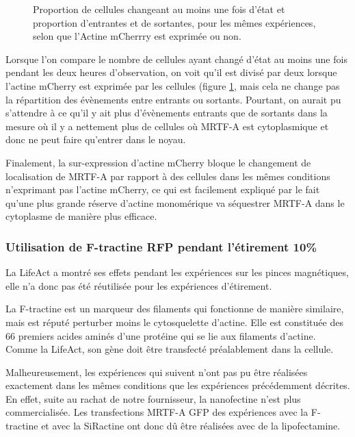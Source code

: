 \begin{figure}
\caption{\label{AMC}Répartition initiale pour des cellules issues des mêmes expériences exprimant ou non le plasmide Actine mCherry (683 cellules témoin et 538 cellules expriment l'Actine mCherry). **** : $p<10^{-4}$}\caption{\label{AMC_transloc}Proportion de cellules changeant au moins une fois d'état et proportion d'entrantes et de sortantes, pour les mêmes expériences, selon que l'Actine mCherrry est exprimée ou non.}
\end{figure}

Lorsque l'on compare le nombre de cellules ayant changé d'état au moins une fois pendant les deux heures d'observation, on voit qu'il est divisé par deux lorsque l'actine mCherry est exprimée par les cellules (figure \ref{AMC_transloc}, mais cela ne change pas la répartition des évènements entre entrants ou sortants. 
Pourtant, on aurait pu s'attendre à ce qu'il y ait plus d'évènements entrants que de sortants dans la mesure où il y a nettement plus de cellules où MRTF-A est cytoplasmique et donc ne peut faire qu'entrer dans le noyau. 

Finalement, la sur-expression d'actine mCherry bloque le changement de localisation de MRTF-A par rapport à des cellules dans les mêmes conditions n'exprimant pas l’actine mCherry, ce qui est facilement expliqué par le fait qu'une plus grande réserve d'actine monomérique va séquestrer MRTF-A dans le cytoplasme de manière plus efficace.

\subsubsection{Utilisation de F-tractine RFP pendant l'étirement 10\%}


La LifeAct a montré ses effets pendant les expériences sur les pinces magnétiques, elle n'a donc pas été réutilisée pour les expériences d'étirement. 

La F-tractine est un marqueur des filaments qui fonctionne de manière similaire, mais est réputé perturber moins le cytosquelette d'actine. Elle est constituée des 66 premiers acides aminés d'une protéine qui se lie aux filaments d'actine. Comme la LifeAct, son gène doit être transfecté préalablement dans la cellule. 

Malheureusement, les expériences qui suivent n'ont pas pu être réalisées exactement dans les mêmes conditions que les expériences précédemment décrites. En effet, suite au rachat de notre fournisseur, la nanofectine n'est plus commercialisée. Les transfections MRTF-A GFP des expériences avec la F-tractine et avec la SiRactine ont donc dû être réalisées avec de la lipofectamine. 

